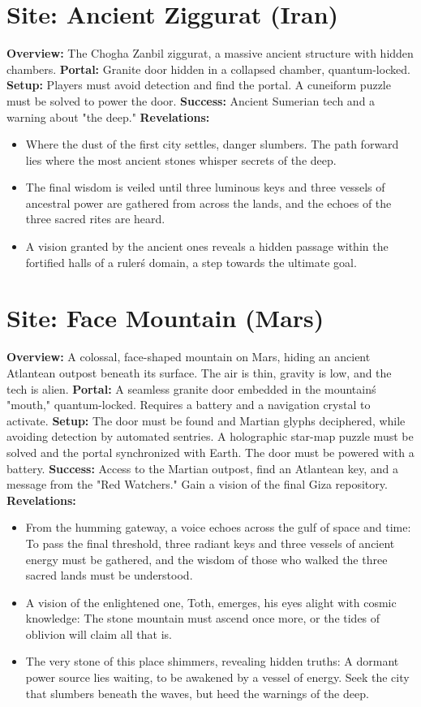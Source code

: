 \documentclass[12pt]{article}
\begin{document}
\hrulefill

\section*{Site: Ancient Ziggurat (Iran)}
\textbf{Overview:}
The Chogha Zanbil ziggurat, a massive ancient structure with hidden chambers.
\textbf{Portal:}
Granite door hidden in a collapsed chamber, quantum-locked.
\textbf{Setup:}
Players must avoid detection and find the portal. A cuneiform puzzle must be solved to power the door.
\textbf{Success:}
Ancient Sumerian tech and a warning about "the deep."
\textbf{Revelations:}
\begin{itemize}
  \item Where the dust of the first city settles, danger slumbers. The path forward lies where the most ancient stones whisper secrets of the deep.
  \item The final wisdom is veiled until three luminous keys and three vessels of ancestral power are gathered from across the lands, and the echoes of the three sacred rites are heard.
  \item A vision granted by the ancient ones reveals a hidden passage within the fortified halls of a ruler\'s domain, a step towards the ultimate goal.
\end{itemize}

\hrulefill

\section*{Site: Face Mountain (Mars)}
\textbf{Overview:}
A colossal, face-shaped mountain on Mars, hiding an ancient Atlantean outpost beneath its surface. The air is thin, gravity is low, and the tech is alien.
\textbf{Portal:}
A seamless granite door embedded in the mountain\'s "mouth," quantum-locked. Requires a battery and a navigation crystal to activate.
\textbf{Setup:}
The door must be found and Martian glyphs deciphered, while avoiding detection by automated sentries. A holographic star-map puzzle must be solved and the portal synchronized with Earth. The door must be powered with a battery.
\textbf{Success:}
Access to the Martian outpost, find an Atlantean key, and a message from the "Red Watchers." Gain a vision of the final Giza repository.
\textbf{Revelations:}
\begin{itemize}
  \item From the humming gateway, a voice echoes across the gulf of space and time: To pass the final threshold, three radiant keys and three vessels of ancient energy must be gathered, and the wisdom of those who walked the three sacred lands must be understood.
  \item A vision of the enlightened one, Toth, emerges, his eyes alight with cosmic knowledge: The stone mountain must ascend once more, or the tides of oblivion will claim all that is.
  \item The very stone of this place shimmers, revealing hidden truths: A dormant power source lies waiting, to be awakened by a vessel of energy. Seek the city that slumbers beneath the waves, but heed the warnings of the deep.
\end{itemize}
\end{document}
